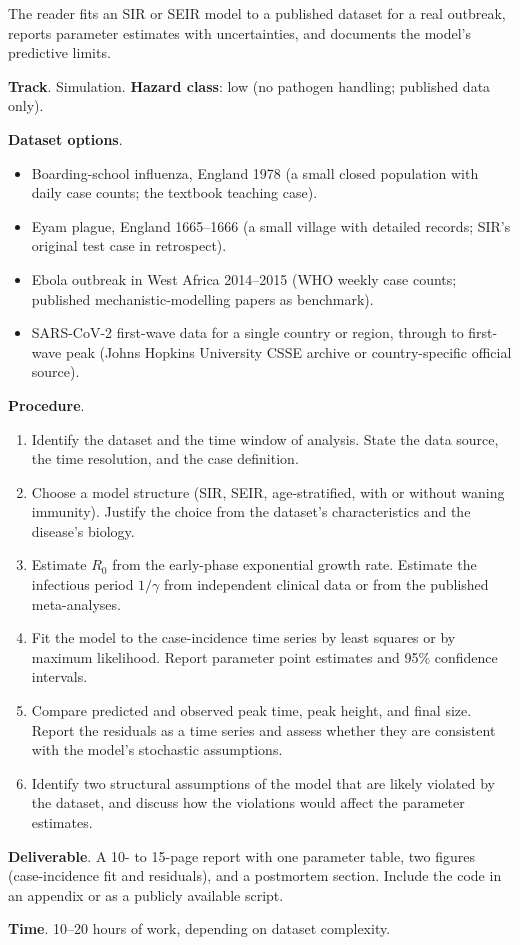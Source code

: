 \begin{project}
The reader fits an SIR or SEIR model to a published dataset for a
real outbreak, reports parameter estimates with uncertainties, and
documents the model's predictive limits.

\textbf{Track}. Simulation.
\textbf{Hazard class}: low (no pathogen handling; published data
only).

\textbf{Dataset options}.

\begin{itemize}[leftmargin=*]
\item Boarding-school influenza, England 1978 (a small closed
  population with daily case counts; the textbook teaching case).
\item Eyam plague, England 1665--1666 (a small village with detailed
  records; SIR's original test case in retrospect).
\item Ebola outbreak in West Africa 2014--2015 (WHO weekly case
  counts; published mechanistic-modelling papers as benchmark).
\item SARS-CoV-2 first-wave data for a single country or region,
  through to first-wave peak (Johns Hopkins University CSSE archive
  or country-specific official source).
\end{itemize}

\textbf{Procedure}.

\begin{enumerate}[leftmargin=*]
\item Identify the dataset and the time window of analysis. State
  the data source, the time resolution, and the case definition.
\item Choose a model structure (SIR, SEIR, age-stratified, with or
  without waning immunity). Justify the choice from the dataset's
  characteristics and the disease's biology.
\item Estimate $R_0$ from the early-phase exponential growth rate.
  Estimate the infectious period $1/\gamma$ from independent clinical
  data or from the published meta-analyses.
\item Fit the model to the case-incidence time series by least
  squares or by maximum likelihood. Report parameter point estimates
  and 95\% confidence intervals.
\item Compare predicted and observed peak time, peak height, and
  final size. Report the residuals as a time series and assess
  whether they are consistent with the model's stochastic
  assumptions.
\item Identify two structural assumptions of the model that are
  likely violated by the dataset, and discuss how the violations
  would affect the parameter estimates.
\end{enumerate}

\textbf{Deliverable}. A 10- to 15-page report with one parameter
table, two figures (case-incidence fit and residuals), and a
postmortem section. Include the code in an appendix or as a
publicly available script.

\textbf{Time}. 10--20 hours of work, depending on dataset complexity.
\end{project}


